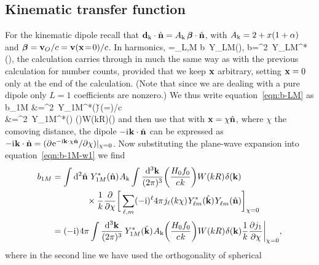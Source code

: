 \subsection{Kinematic transfer function}\label{app:calc-b1m}
For the kinematic dipole recall that $\mathbf{d}_{{\rm k}}\cdot\hat{\mathbf{n}}=A_{\rm k}\,\bm\beta\cdot\hat{\mathbf{n}}$, with
$A_{\rm k}=2+x(1+\alpha)$ and $\bm\beta=\mathbf{v}_O/c=\mathbf{v}(\mathbf{x}\!=\!0)/c$. In harmonics,
\be
	\dkin\cdot\n
	=\sum_{L,M} b\, Y_{LM}(\n),
\quad
	b=\int\dif^2\n~Y_{LM}^*(\n)\ssp\dkin\cdot\n,
\ee
the calculation carries through in much the same way as with the previous calculation for number
counts, {provided} that we keep $\mathbf{x}$ arbitrary, setting $\mathbf{x}=0$ only at the end of the
calculation. (Note that since we are dealing with a pure dipole only
$L=1$ coefficients are nonzero.) We thus write equation~\eqref{eqn:b-LM} as
\bea
    b_{1M}
        &=\int\dif^2\n\ Y_{1M}^*(\n)\ssp\ckin\,\v{}(\x\!=)\cdot\n/c \nonumber\\[-2pt]
        &=\int\dif^2\n\ Y_{1M}^*(\n)\ssp\ckin
            \int{}
            \bigg(\bigg)\sp W(kR)\sp\delta(\bk)
    \label{eqn:b-1M-w1}
\eea
and then use that with $\mathbf{x}=\chi\hat{\mathbf{n}}$, where $\chi$ the comoving distance, the dipole 
$-\mathrm{i}\hspace{0.06em}\mathbf{k}\cdot\hat{\mathbf{n}}$ can be expressed as 
$-\mathrm{i}\hspace{0.06em}\mathbf{k}\cdot\hat{\mathbf{n}}=(\partial\hspace{0.06em}\mathrm{e}^{-\mathrm{i}\mathbf{k}\cdot\chi\hat{\mathbf{n}}}/\partial\chi)|_{\chi=0}$.
Now substituting the plane-wave expansion
into equation~\eqref{eqn:b-1M-w1} we find
\begin{align*}
    b_{1M}
        &=\int\dif^2\n\ Y_{1M}^*(\n)\sp\ckin
            \int\frac{\dif^3\bk}{(2\pi)^3}
            \bigg(\frac{H_0f_0}{c\sp k}\bigg) W(kR)\sp\delta(\bk) \nonumber\\
        &\qquad\qquad\times
            \frac1k\frac{\partial}{\partial\chi}
            \bigg[\sum_{\ell,m}(-\im)^{\ell}4\pi\sp j_\ell(k\chi)\sp
                    Y^*_{\ell m}(\hat\bk)\sp Y\Z{\ell m}(\n)\bigg]_{\chi=0} \nonumber\\[2pt]
        &=(-\im)\sp4\pi\int\frac{\dif^3\bk}{(2\pi)^3}\:
            Y^*_{1M}(\hat\bk)\sp \ckin\bigg(\frac{H_0f_0}{c\sp k}\bigg)W(kR)\sp\delta(\bk)
                \frac1k\frac{\partial j_1}{\partial\chi}\bigg|_{\chi=0},
\end{align*}
where in the second line we have used the orthogonality of spherical
